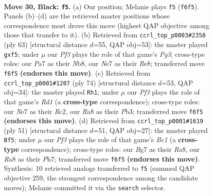 \documentclass[11pt]{article}
\begin{document}
\clearpage

\begin{figure}[p]\centering
\begin{subfigure}{0.46\textwidth}\centering
\resizebox{\linewidth}{!}{%
\newchessgame
\chessboard[
  setfen={r5k1/p3n1bp/Ppr2p2/6PR/4pP2/8/4B3/R1B1K3 b Q - 0 30},
  showmover=false,
  pgfstyle=straightmove, color=movearrow, markmove={f6-f5}
]}
\caption{}
\end{subfigure}\hfill
\begin{subfigure}{0.46\textwidth}\centering
\resizebox{\linewidth}{!}{%
\newchessgame
\chessboard[
  setfen={1n2r1kb/4p2p/2p3pP/4pP2/4B3/4B3/R3KP2/8 b - - 0 32},
  showmover=false,
  pgfstyle=straightmove, color=movearrow, markmove={g6-f5}
]}
\caption{}
\end{subfigure}
\\[4pt]
\begin{subfigure}{0.46\textwidth}\centering
\resizebox{\linewidth}{!}{%
\newchessgame
\chessboard[
  setfen={1r5r/5p2/5k2/p1p1pp2/2Bb3P/1P3PP1/P1R3K1/3R4 w - - 3 38},
  showmover=false,
  pgfstyle=straightmove, color=movearrow, markmove={d1-h1}
]}
\caption{}
\end{subfigure}\hfill
\begin{subfigure}{0.46\textwidth}\centering
\resizebox{\linewidth}{!}{%
\newchessgame
\chessboard[
  setfen={r1brk3/1p2pp1p/6p1/1R1PP3/7P/p3KP2/B1R3P1/8 b - - 0 26},
  showmover=false,
  pgfstyle=straightmove, color=movearrow, markmove={c8-f5}
]}
\caption{}
\end{subfigure}
\caption{\textbf{Move 30, Black: \texttt{f5}.} (a) Our position; Melanie plays \texttt{f5} (\texttt{f6f5}). Panels (b)--(d) are the retrieved master positions whose correspondence most drove this move (highest QAP objective among those that transfer to it). (b) Retrieved from \texttt{ccrl\_top\_p0003\#2358} (ply 63) [structural distance $d$=55, QAP obj=53]: the master played \texttt{gxf5}; under $\mu$ our \emph{Pf3} plays the role of that game's \emph{Pg3}; cross-type roles: our \emph{P}a7 as their \emph{N}b8, our \emph{N}e7 as their \emph{R}e8; transferred move \texttt{f6f5} \textbf{(endorses this move)}. (c) Retrieved from \texttt{ccrl\_top\_p0001\#1207} (ply 74) [structural distance $d$=53, QAP obj=34]: the master played \texttt{Rh1}; under $\mu$ our \emph{Pf3} plays the role of that game's \emph{Rd1} (a \textbf{cross-type} correspondence); cross-type roles: our \emph{N}e7 as their \emph{R}c2, our \emph{R}a8 as their \emph{P}b3; transferred move \texttt{f6f5} \textbf{(endorses this move)}. (d) Retrieved from \texttt{ccrl\_top\_p0001\#1619} (ply 51) [structural distance $d$=51, QAP obj=27]: the master played \texttt{Bf5}; under $\mu$ our \emph{Pf3} plays the role of that game's \emph{Bc1} (a \textbf{cross-type} correspondence); cross-type roles: our \emph{B}g7 as their \emph{R}a8, our \emph{R}a8 as their \emph{P}h7; transferred move \texttt{f6f5} \textbf{(endorses this move)}. Synthesis: 10 retrieved analogs transferred to \texttt{f5} (summed QAP objective 259, the strongest correspondence among the candidate moves); Melanie committed it via the \texttt{search} selector.}
\label{fig:thought-m59}
\end{figure}
\end{document}
